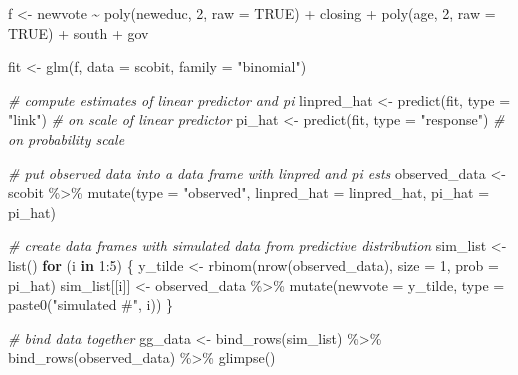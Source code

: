 \documentclass[
]{book}
\newenvironment{Shaded}{\begin{snugshade}}{\end{snugshade}}
\newcommand{\AttributeTok}[1]{\textcolor[rgb]{0.77,0.63,0.00}{#1}}
\newcommand{\CommentTok}[1]{\textcolor[rgb]{0.56,0.35,0.01}{\textit{#1}}}
\newcommand{\ConstantTok}[1]{\textcolor[rgb]{0.00,0.00,0.00}{#1}}
\newcommand{\ControlFlowTok}[1]{\textcolor[rgb]{0.13,0.29,0.53}{\textbf{#1}}}
\newcommand{\DecValTok}[1]{\textcolor[rgb]{0.00,0.00,0.81}{#1}}
\newcommand{\FunctionTok}[1]{\textcolor[rgb]{0.00,0.00,0.00}{#1}}
\newcommand{\NormalTok}[1]{#1}
\newcommand{\OtherTok}[1]{\textcolor[rgb]{0.56,0.35,0.01}{#1}}
\newcommand{\SpecialCharTok}[1]{\textcolor[rgb]{0.00,0.00,0.00}{#1}}
\newcommand{\StringTok}[1]{\textcolor[rgb]{0.31,0.60,0.02}{#1}}
\begin{document}
\begin{Shaded}
\begin{Highlighting}[]
\NormalTok{f }\OtherTok{\textless{}{-}}\NormalTok{ newvote }\SpecialCharTok{\textasciitilde{}} \FunctionTok{poly}\NormalTok{(neweduc, }\DecValTok{2}\NormalTok{, }\AttributeTok{raw =} \ConstantTok{TRUE}\NormalTok{) }\SpecialCharTok{+}\NormalTok{ closing }\SpecialCharTok{+} \FunctionTok{poly}\NormalTok{(age, }\DecValTok{2}\NormalTok{, }\AttributeTok{raw =} \ConstantTok{TRUE}\NormalTok{) }\SpecialCharTok{+}\NormalTok{ south }\SpecialCharTok{+}\NormalTok{ gov}

\NormalTok{fit }\OtherTok{\textless{}{-}} \FunctionTok{glm}\NormalTok{(f, }\AttributeTok{data =}\NormalTok{ scobit, }\AttributeTok{family =} \StringTok{"binomial"}\NormalTok{)}

\CommentTok{\# compute estimates of linear predictor and pi}
\NormalTok{linpred\_hat }\OtherTok{\textless{}{-}} \FunctionTok{predict}\NormalTok{(fit, }\AttributeTok{type =} \StringTok{"link"}\NormalTok{)  }\CommentTok{\# on scale of linear predictor}
\NormalTok{pi\_hat }\OtherTok{\textless{}{-}} \FunctionTok{predict}\NormalTok{(fit, }\AttributeTok{type =} \StringTok{"response"}\NormalTok{)   }\CommentTok{\# on probability scale}

\CommentTok{\# put observed data into a data frame with linpred and pi ests}
\NormalTok{observed\_data }\OtherTok{\textless{}{-}}\NormalTok{ scobit }\SpecialCharTok{\%\textgreater{}\%}
  \FunctionTok{mutate}\NormalTok{(}\AttributeTok{type =} \StringTok{"observed"}\NormalTok{, }
         \AttributeTok{linpred\_hat =}\NormalTok{ linpred\_hat, }
         \AttributeTok{pi\_hat =}\NormalTok{ pi\_hat)}

\CommentTok{\# create data frames with simulated data from predictive distribution}
\NormalTok{sim\_list }\OtherTok{\textless{}{-}} \FunctionTok{list}\NormalTok{()}
\ControlFlowTok{for}\NormalTok{ (i }\ControlFlowTok{in} \DecValTok{1}\SpecialCharTok{:}\DecValTok{5}\NormalTok{) \{}
\NormalTok{  y\_tilde }\OtherTok{\textless{}{-}} \FunctionTok{rbinom}\NormalTok{(}\FunctionTok{nrow}\NormalTok{(observed\_data), }\AttributeTok{size =} \DecValTok{1}\NormalTok{, }\AttributeTok{prob =}\NormalTok{ pi\_hat)}
\NormalTok{  sim\_list[[i]] }\OtherTok{\textless{}{-}}\NormalTok{ observed\_data }\SpecialCharTok{\%\textgreater{}\%}
    \FunctionTok{mutate}\NormalTok{(}\AttributeTok{newvote =}\NormalTok{ y\_tilde, }
           \AttributeTok{type =} \FunctionTok{paste0}\NormalTok{(}\StringTok{"simulated \#"}\NormalTok{, i))}
\NormalTok{\}}

\CommentTok{\# bind data together}
\NormalTok{gg\_data }\OtherTok{\textless{}{-}} \FunctionTok{bind\_rows}\NormalTok{(sim\_list) }\SpecialCharTok{\%\textgreater{}\%}
  \FunctionTok{bind\_rows}\NormalTok{(observed\_data) }\SpecialCharTok{\%\textgreater{}\%}
  \FunctionTok{glimpse}\NormalTok{()}
\end{Highlighting}
\end{Shaded}
\end{document}
